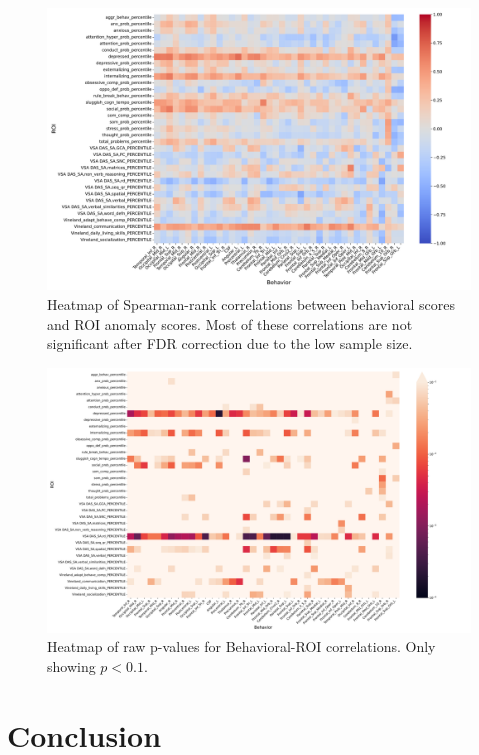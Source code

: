 \begin{figure}[tbhp]
\centering
\includegraphics[width=\linewidth]{figures/full_corrmatrix.pdf}
\caption{Heatmap of Spearman-rank correlations between behavioral scores and ROI anomaly scores. Most of these correlations are not significant after FDR correction due to the low sample size.}
\label{fig:full-roi-corr}
\end{figure}

\begin{figure}[tbhp]
\centering
\includegraphics[width=\linewidth]{figures/pmatrix.pdf}
\caption{Heatmap of raw p-values for Behavioral-ROI correlations. Only showing $p < 0.1$.}
\label{fig:full-roi-corr}
\end{figure}

\section{Conclusion}

